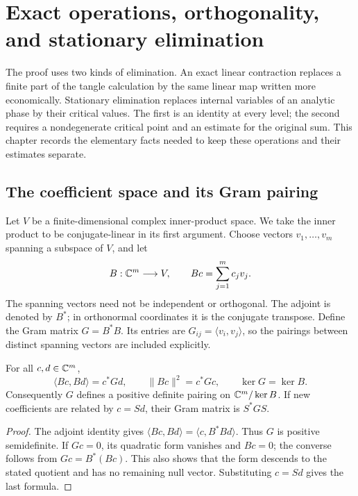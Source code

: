 \chapter{Exact operations, orthogonality, and stationary elimination}
\label{ch:exact-concepts}

The proof uses two kinds of elimination. An exact linear contraction
replaces a finite part of the tangle calculation by the same linear
map written more economically. Stationary elimination replaces
internal variables of an analytic phase by their critical values.
The first is an identity at every level; the second requires a
nondegenerate critical point and an estimate for the original sum.
This chapter records the elementary facts needed to keep these
operations and their estimates separate.

\section{The coefficient space and its Gram pairing}

Let $V$ be a finite-dimensional complex inner-product space. We take
the inner product to be conjugate-linear in its first argument.
Choose vectors $v_1,\ldots,v_m$ spanning a subspace of $V$, and let
\[
 B:\mathbb C^m\longrightarrow V,\qquad Bc=\sum_{j=1}^m c_jv_j.
\]
The spanning vectors need not be independent or orthogonal. The
adjoint is denoted by $B^*$; in orthonormal coordinates it is the
conjugate transpose. Define the Gram matrix $G=B^*B$. Its entries are
$G_{ij}=\langle v_i,v_j\rangle$, so the pairings between distinct
spanning vectors are included explicitly.

\begin{proposition}
\label{prop:coefficient-gram}
For all $c,d\in\mathbb C^m$,
\[
 \langle Bc,Bd\rangle=c^*Gd,\qquad
 \|Bc\|^2=c^*Gc,\qquad
 \ker G=\ker B.
\]
Consequently $G$ defines a positive definite pairing on
$\mathbb C^m/\ker B$. If new coefficients are related by $c=Sd$, their
Gram matrix is $S^*GS$.
\end{proposition}
\begin{proof}
The adjoint identity gives
$\langle Bc,Bd\rangle=\langle c,B^*Bd\rangle$.
Thus $G$ is positive semidefinite. If $Gc=0$, its quadratic form
vanishes and $Bc=0$; the converse follows from $Gc=B^*(Bc)$.
This also shows that the form descends to the stated quotient and
has no remaining null vector. Substituting $c=Sd$ gives the last
formula.
\end{proof}

